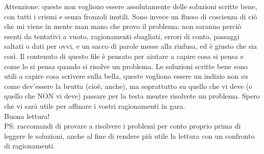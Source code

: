 Attenzione: queste non vogliono essere assolutamente delle soluzioni scritte bene, con tutti i crismi e senza fronzoli inutili. Sono invece un flusso di coscienza di ciò che mi viene in mente man mano che provo il problema: non saranno perciò esenti da tentativi a vuoto, ragionamenti sbagliati, errori di conto, passaggi saltati o dati per ovvi, e un sacco di parole messe alla rinfusa, ed è giusto che sia così. Il contenuto di questo file è pensato per aiutare a capire cosa si pensa e come lo si pensa quando si risolve un problema. Le soluzioni scritte bene sono utili a capire cosa scrivere sulla bella, queste vogliono essere un indizio non su come dev'essere la brutta (cioè, anche), ma soprattutto su quello che vi deve (e quello che NON vi deve) passare per la testa mentre risolvete un problema. Spero che vi sarà utile per affinare i vostri ragionamenti in gara. \\
Buona lettura! \\

PS: raccomandi di provare a risolvere i problemi per conto proprio prima di leggere le soluzioni, anche al fine di rendere più utile la lettura con un confronto di ragionamenti.
